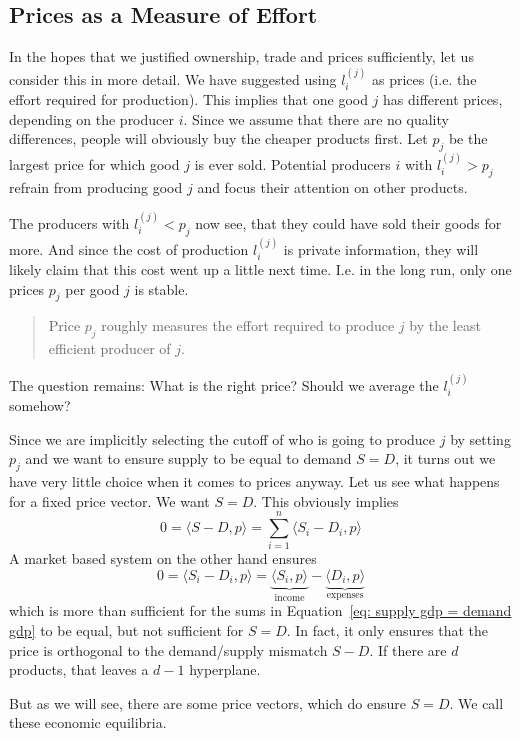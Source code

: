 \subsection{Prices as a Measure of Effort}

In the hopes that we justified ownership, trade and prices sufficiently, let us
consider this in more detail. We have suggested using \(l^{(j)}_i\) as prices
(i.e. the effort required for production).  This implies that one good \(j\) has
different prices, depending on the producer \(i\). Since we assume that there
are no quality differences, people will obviously buy the cheaper products
first. Let \(p_j\) be the largest price for which good \(j\) is ever sold.
Potential producers \(i\) with \(l^{(j)}_i > p_j\) refrain from producing good
\(j\) and focus their attention on other products.

The producers with \(l^{(j)}_i < p_j\) now see, that they could have sold their
goods for more. And since the cost of production \(l^{(j)}_i\) is private
information, they will likely claim that this cost went up a little next time.
I.e. in the long run, only one prices \(p_j\) per good \(j\) is stable.
\begin{quotation}
\noindent Price \(p_j\) roughly measures the effort required to produce \(j\) by
the least efficient producer of \(j\).
\end{quotation}

The question remains: What is the right price? Should we average the
\(l^{(j)}_i\) somehow?

Since we are implicitly selecting the cutoff of who is going to produce \(j\) by
setting \(p_j\) and we want to ensure supply to be equal to demand \(S=D\), it
turns out we have very little choice when it comes to prices anyway. Let us see
what happens for a fixed price vector. We want \(S=D\). This obviously implies
\begin{equation}
	\label{eq: supply gdp = demand gdp}
	0 =\langle S-D,p\rangle =  \sum_{i=1}^n \langle S_i - D_i, p\rangle
\end{equation}
A market based system on the other hand ensures
\[
	0 = \langle S_i - D_i, p\rangle
	= \underbrace{\langle S_i, p\rangle}_{\text{income}}
	- \underbrace{\langle D_i,p\rangle}_{\text{expenses}}
\]
which is more than sufficient for the sums in Equation~\eqref{eq: supply gdp =
demand gdp} to be equal, but not sufficient for \(S=D\). In fact, it only
ensures that the price is orthogonal to the demand/supply mismatch \(S-D\).
If there are \(d\) products, that leaves a \(d-1\) hyperplane.

But as we will see, there are some price vectors, which do ensure \(S=D\).
We call these economic equilibria.
